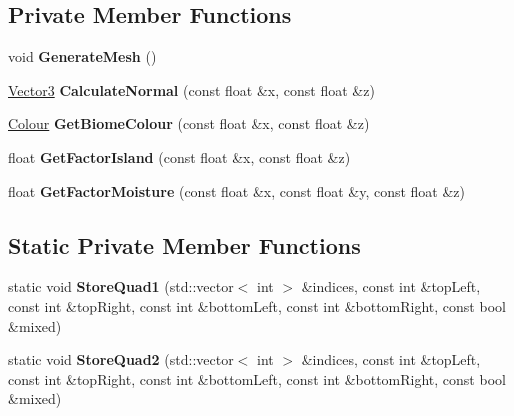 \subsection*{Private Member Functions}
\begin{DoxyCompactItemize}
\item 
\mbox{\label{class_flounder_1_1_terrain_a77a4c4c5143ca824ad7b737860be84a0}} 
void {\bfseries Generate\+Mesh} ()
\item 
\mbox{\label{class_flounder_1_1_terrain_aa951bcbb95e46fb9e4028267115cc9e2}} 
\hyperlink{class_flounder_1_1_vector3}{Vector3} {\bfseries Calculate\+Normal} (const float \&x, const float \&z)
\item 
\mbox{\label{class_flounder_1_1_terrain_acd676f20c58bae8f45aad8614b037ab7}} 
\hyperlink{class_flounder_1_1_colour}{Colour} {\bfseries Get\+Biome\+Colour} (const float \&x, const float \&z)
\item 
\mbox{\label{class_flounder_1_1_terrain_a9572a1ae3021b1c5793154cf1edd5c90}} 
float {\bfseries Get\+Factor\+Island} (const float \&x, const float \&z)
\item 
\mbox{\label{class_flounder_1_1_terrain_afbbac5fe21e5602fb18e2c338f139235}} 
float {\bfseries Get\+Factor\+Moisture} (const float \&x, const float \&y, const float \&z)
\end{DoxyCompactItemize}
\subsection*{Static Private Member Functions}
\begin{DoxyCompactItemize}
\item 
\mbox{\label{class_flounder_1_1_terrain_aa1cc74a8a86d3a78da50d26eb2e49b69}} 
static void {\bfseries Store\+Quad1} (std\+::vector$<$ int $>$ \&indices, const int \&top\+Left, const int \&top\+Right, const int \&bottom\+Left, const int \&bottom\+Right, const bool \&mixed)
\item 
\mbox{\label{class_flounder_1_1_terrain_a9099c3f601dfa739393550af6798c81f}} 
static void {\bfseries Store\+Quad2} (std\+::vector$<$ int $>$ \&indices, const int \&top\+Left, const int \&top\+Right, const int \&bottom\+Left, const int \&bottom\+Right, const bool \&mixed)
\end{DoxyCompactItemize}
